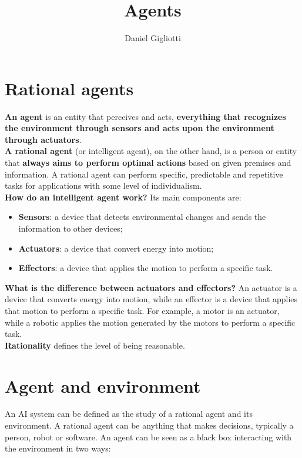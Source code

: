 \documentclass{article}
\title{Agents}
\author{Daniel Gigliotti}
\date{}
\begin{document}
\maketitle

\section{Rational agents}

\textbf{An agent} is an entity that perceives and acts, \textbf{everything that recognizes the environment through sensors and acts upon the environment through actuators}. \\


\textbf{A rational agent} (or intelligent agent), on the other hand, is a person or entity that \textbf{always aims to perform optimal actions} based on given premises and information. A rational agent can perform specific, predictable and repetitive tasks for applications with some level of individualism. \\


\textbf{How do an intelligent agent work?} Its main components are:
\begin{itemize}
\item \textbf{Sensors}: a device that detects environmental changes and sends the information to other devices;
\item \textbf{Actuators}: a device that convert energy into motion;
\item \textbf{Effectors}: a device that applies the motion to perform a specific task.
\end{itemize} 

\textbf{What is the difference between actuators and effectors?}
An actuator is a device that converts energy into motion, while an effector is a device that applies that motion to perform a specific task. For example, a motor is an actuator, while a robotic applies the motion generated by the motors to perform a specific task. \\

\textbf{Rationality} defines the level of being reasonable.

\newpage

\section{Agent and environment}

An AI system can be defined as the study of a rational agent and its environment. 
A rational agent can be anything that makes decisions, typically a person, robot or software. An agent can be seen as a black box interacting with the environment in two ways:
\end{document}
